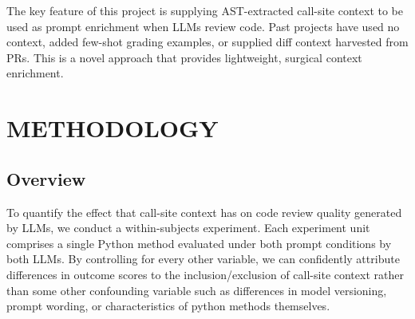 \documentclass[12pt]{report}
\begin{document}
\begin{table}[htbp]
\centering
\small
\setlength{\tabcolsep}{4pt}
\caption{Comparison of this project to the most closely related prior studies.}
\label{tab:related}
\end{table}

The key feature of this project is supplying AST-extracted call-site context
to be used as prompt enrichment when LLMs review code. Past projects have used 
no context, added few-shot grading examples, or supplied diff context harvested from PRs. This is a novel approach that provides lightweight, surgical context enrichment. 

\chapter{METHODOLOGY}

\section{Overview}

To quantify the effect that call-site context has on code review quality generated by LLMs, we conduct a within-subjects experiment. Each experiment unit comprises a single Python method evaluated under both prompt conditions by both LLMs. By controlling for every other variable, we can confidently attribute differences in outcome scores to the inclusion/exclusion of call-site context rather than some other confounding variable such as differences in model versioning, prompt wording, or characteristics of python methods themselves.
\end{document}
